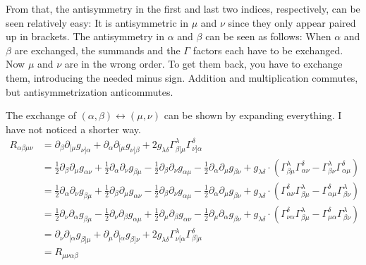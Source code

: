 From that, the antisymmetry in the first and last two indices, respectively,
can be seen relatively easy: It is antisymmetric in $\mu$ and $\nu$ since they
only appear paired up in brackets. The antisymmetry in $\alpha$ and $\beta$ can
be seen as follows: When $\alpha$ and $\beta$ are exchanged, the summands and
the $\Gamma$ factors each have to be exchanged. Now $\mu$ and $\nu$ are in the
wrong order. To get them back, you have to exchange them, introducing the
needed minus sign. Addition and multiplication commutes, but antisymmetrization
anticommutes.

The exchange of $(\alpha, \beta) \leftrightarrow (\mu, \nu)$ can be shown by
expanding everything. I have not noticed a shorter way.
\begin{align*}
    R_{\alpha\beta\mu\nu}
    &= \partial_\beta \partial_{[\mu} g_{\nu]\alpha}
    + \partial_\alpha \partial_{[\mu} g_{\nu]\beta}
    + 2 g_{\lambda\delta} \Gamma^\lambda_{\beta[\mu} \Gamma^\delta_{\nu]\alpha}
    \\
    &=
    \frac 12 \partial_\beta \partial_\mu g_{\alpha\nu}
    + \frac 12 \partial_\alpha \partial_\nu g_{\beta\mu}
    - \frac 12 \partial_\beta \partial_\nu g_{\alpha\mu}
    - \frac 12 \partial_\alpha \partial_\mu g_{\beta\nu}
    + g_{\lambda\delta} \cdot (
    \Gamma^\lambda_{\beta\mu} \Gamma^\delta_{\alpha\nu}
    - \Gamma^\lambda_{\beta\nu} \Gamma^\delta_{\alpha\mu}
    ) \\
    &=
    \frac 12 \partial_\alpha \partial_\nu g_{\beta\mu}
    + \frac 12 \partial_\beta \partial_\mu g_{\alpha\nu}
    - \frac 12 \partial_\beta \partial_\nu g_{\alpha\mu}
    - \frac 12 \partial_\alpha \partial_\mu g_{\beta\nu}
    + g_{\lambda\delta} \cdot (
    \Gamma^\delta_{\alpha\nu} \Gamma^\lambda_{\beta\mu} 
    - \Gamma^\delta_{\alpha\mu} \Gamma^\lambda_{\beta\nu} 
    ) \\
    &=
      \frac 12 \partial_\nu \partial_\alpha g_{\beta \mu}
    - \frac 12 \partial_\nu \partial_\beta  g_{\alpha\mu}
    + \frac 12 \partial_\mu \partial_\beta  g_{\alpha\nu}
    - \frac 12 \partial_\mu \partial_\alpha g_{\beta \nu}
    + g_{\lambda\delta} \cdot (
    \Gamma^\delta_{\nu\alpha} \Gamma^\lambda_{\beta\mu} 
    - \Gamma^\delta_{\mu\alpha} \Gamma^\lambda_{\beta\nu} 
    ) \\
    &= \partial_\nu \partial_{[\alpha} g_{\beta]\mu}
    + \partial_\mu \partial_{[\alpha} g_{\beta]\nu}
    + 2 g_{\lambda\delta} \Gamma^\lambda_{\nu[\alpha} \Gamma^\delta_{\beta]\mu}
    \\
    &=
    R_{\mu\nu\alpha\beta}
\end{align*}

